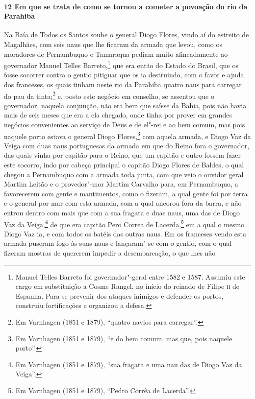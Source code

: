 \paragraph{12 Em que se trata de como se tornou a cometer a povoação do rio da Parahiba}

Na Baía de Todos os Santos soube o general Diogo Flores, vindo aí do estreito de
Magalhães, com seis naus que lhe ficaram da armada que levou, como os moradores de
Pernambuquo e Tamaraqua pediam muito afincadamente ao governador Manuel Telles
Barreto,\footnote{ Manuel Telles Barreto foi governador"-geral entre 1582 e 1587. Assumiu
este cargo em substituição a Cosme Rangel, no início do reinado de Filipe \textsc{ii} de
Espanha. Para se prevenir dos ataques inimigos e defender os portos, construiu
fortificações e organizou a defesa.} que era então do Estado do Brasil, que os fosse
socorrer contra o gentio pitiguar que os ia destruindo, com o favor e ajuda dos franceses,
os quais tinham neste rio da Parahiba quatro naus para carregar do pau da tinta;\footnote{
Em Varnhagen (1851 e 1879), ``quatro navios para carregar''.} e, posto este negócio em
conselho, se assentou que o governador, naquela conjunção, não era bem que saísse da
Bahia, pois não havia mais de seis meses que era a ela chegado, onde tinha por prover em
grandes negócios convenientes ao serviço de Deus e de el"-rei e ao bem comum, mas pois
naquele porto estava o general Diogo Flores,\footnote{ Em Varnhagen (1851 e 1879), ``e do
bem comum, mas que, pois naquele porto''.} com aquela armada, e Diogo Vaz da Veiga com
duas naus portuguesas da armada em que do Reino fora o governador, das quais vinha por
capitão para o Reino, que um capitão e outro fossem fazer este socorro, indo por cabeça
principal o capitão Diogo Flores de Baldes, o qual chegou a Pernambuquo com a armada toda
junta, com que veio o ouvidor geral Martim Leitão e o provedor"-mor Martim Carvalho para,
em Pernambuquo, a favorecerem com gente e mantimentos, como o fizeram, a qual gente foi
por terra e o general por mar com esta armada, com a qual ancorou fora da barra, e não
entrou dentro com mais que com a sua fragata e duas naus, uma das de Diogo Vaz da
Veiga,\footnote{ Em Varnhagen (1851 e 1879), ``sua fragata e uma nau das de Diogo Vaz da
Veiga''.} de que era capitão Pero Correa de Lacerda,\footnote{ Em Varnhagen (1851 e 1879),
``Pedro Corrêa de Lacerda''.} em a qual o mesmo Diogo Vaz ia, e com todos os batéis das
outras naus. Em os franceses vendo esta armada puseram fogo às suas naus e lançaram"-se com
o gentio, com o qual fizeram mostras de quererem impedir a desembarcação, o que lhes não
